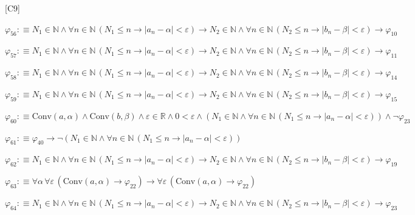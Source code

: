 \begin{fullproof}{[C9]}
\begin{abbrevlist}
\item $\varphi_{56} :\equiv N_{1} \in \mathbb{N} \land \forall n \in \mathbb{N}\,(N_{1} \leq n \to \lvert a_{n} - \alpha \rvert < \varepsilon) \to N_{2} \in \mathbb{N} \land \forall n \in \mathbb{N}\,(N_{2} \leq n \to \lvert b_{n} - \beta \rvert < \varepsilon) \to \varphi_{10}$
\item $\varphi_{57} :\equiv N_{1} \in \mathbb{N} \land \forall n \in \mathbb{N}\,(N_{1} \leq n \to \lvert a_{n} - \alpha \rvert < \varepsilon) \to N_{2} \in \mathbb{N} \land \forall n \in \mathbb{N}\,(N_{2} \leq n \to \lvert b_{n} - \beta \rvert < \varepsilon) \to \varphi_{11}$
\item $\varphi_{58} :\equiv N_{1} \in \mathbb{N} \land \forall n \in \mathbb{N}\,(N_{1} \leq n \to \lvert a_{n} - \alpha \rvert < \varepsilon) \to N_{2} \in \mathbb{N} \land \forall n \in \mathbb{N}\,(N_{2} \leq n \to \lvert b_{n} - \beta \rvert < \varepsilon) \to \varphi_{14}$
\item $\varphi_{59} :\equiv N_{1} \in \mathbb{N} \land \forall n \in \mathbb{N}\,(N_{1} \leq n \to \lvert a_{n} - \alpha \rvert < \varepsilon) \to N_{2} \in \mathbb{N} \land \forall n \in \mathbb{N}\,(N_{2} \leq n \to \lvert b_{n} - \beta \rvert < \varepsilon) \to \varphi_{15}$
\item $\varphi_{60} :\equiv \mathrm{Conv}(a,\alpha) \land \mathrm{Conv}(b,\beta) \land \varepsilon \in \mathbb{R} \land 0 < \varepsilon \land (N_{1} \in \mathbb{N} \land \forall n \in \mathbb{N}\,(N_{1} \leq n \to \lvert a_{n} - \alpha \rvert < \varepsilon)) \land \neg \varphi_{23}$
\item $\varphi_{61} :\equiv \varphi_{40} \to \neg (N_{1} \in \mathbb{N} \land \forall n \in \mathbb{N}\,(N_{1} \leq n \to \lvert a_{n} - \alpha \rvert < \varepsilon))$
\item $\varphi_{62} :\equiv N_{1} \in \mathbb{N} \land \forall n \in \mathbb{N}\,(N_{1} \leq n \to \lvert a_{n} - \alpha \rvert < \varepsilon) \to N_{2} \in \mathbb{N} \land \forall n \in \mathbb{N}\,(N_{2} \leq n \to \lvert b_{n} - \beta \rvert < \varepsilon) \to \varphi_{19}$
\item $\varphi_{63} :\equiv \forall \alpha\,\forall \varepsilon\,(\mathrm{Conv}(a,\alpha) \to \varphi_{22}) \to \forall \varepsilon\,(\mathrm{Conv}(a,\alpha) \to \varphi_{22})$
\item $\varphi_{64} :\equiv N_{1} \in \mathbb{N} \land \forall n \in \mathbb{N}\,(N_{1} \leq n \to \lvert a_{n} - \alpha \rvert < \varepsilon) \to N_{2} \in \mathbb{N} \land \forall n \in \mathbb{N}\,(N_{2} \leq n \to \lvert b_{n} - \beta \rvert < \varepsilon) \to \varphi_{23}$

\end{abbrevlist}
\end{fullproof}
